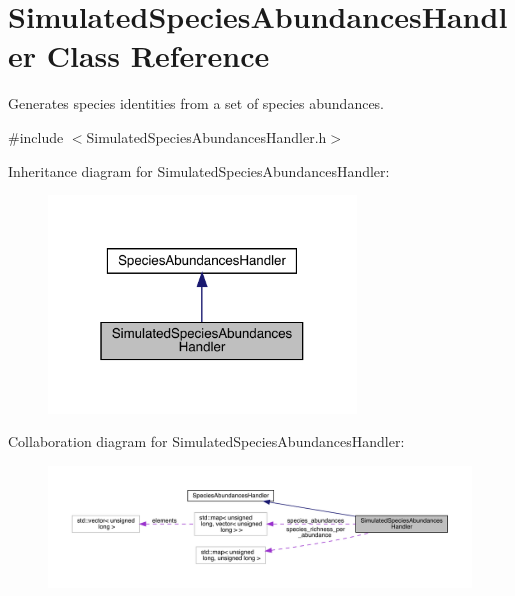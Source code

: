 \hypertarget{class_simulated_species_abundances_handler}{}\section{Simulated\+Species\+Abundances\+Handler Class Reference}
\label{class_simulated_species_abundances_handler}


Generates species identities from a set of species abundances.  




{\ttfamily \#include $<$Simulated\+Species\+Abundances\+Handler.\+h$>$}



Inheritance diagram for Simulated\+Species\+Abundances\+Handler\+:
\nopagebreak
\begin{figure}[H]
\begin{center}
\leavevmode
\includegraphics[width=232pt]{class_simulated_species_abundances_handler__inherit__graph}
\end{center}
\end{figure}


Collaboration diagram for Simulated\+Species\+Abundances\+Handler\+:
\nopagebreak
\begin{figure}[H]
\begin{center}
\leavevmode
\includegraphics[width=350pt]{class_simulated_species_abundances_handler__coll__graph}
\end{center}
\end{figure}
